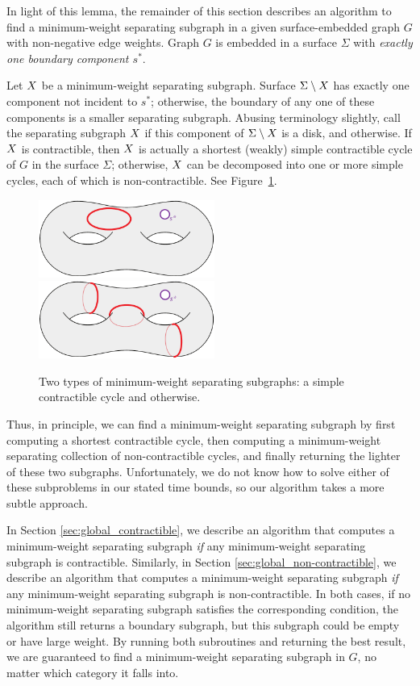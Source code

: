 \documentclass[letterpaper,review]{siamart190516}
\begin{document}
{In light of this lemma, the remainder of this section describes an algorithm to find a minimum-weight separating subgraph in a given surface-embedded graph $G$ with non-negative edge weights.
Graph $G$ is embedded in a surface $\Sigma$ with \emph{exactly one boundary component $s^*$}.

Let $X$ be a minimum-weight separating subgraph.
Surface $\Sigma \setminus X$ has exactly one component not incident to $s^*$; otherwise, the
boundary of any one of these components is a smaller separating subgraph.
Abusing terminology slightly,
call the separating subgraph $X$  if this component of $\Sigma \setminus
X$ is a disk, and  otherwise.  If $X$ is contractible, then
$X$ is actually a shortest (weakly) simple contractible cycle of $G$ in the surface $\Sigma$; otherwise, $X$ can be decomposed into one or more simple cycles, each of which is non-contractible.  See Figure~\ref{fig:global_cases}.


\begin{figure}[ht]
\centering
\includegraphics[height=1in]{Fig/shortcon2}\qquad
\includegraphics[height=1in]{Fig/homologous4}
\caption{Two types of minimum-weight separating subgraphs: a simple contractible cycle and otherwise.}
\label{fig:global_cases}
\end{figure}

Thus, in principle, we can find a minimum-weight separating subgraph by first computing a shortest contractible cycle, then computing a minimum-weight separating collection of non-contractible cycles, and finally returning the lighter of these two subgraphs.  Unfortunately, we do not know how to solve either of these subproblems in our stated time bounds, so our algorithm takes a more subtle approach. 

In Section \ref{sec:global_contractible}, we describe an algorithm that computes a minimum-weight separating subgraph \emph{if} any minimum-weight separating subgraph is contractible.  Similarly, in Section \ref{sec:global_non-contractible}, we describe an algorithm that computes a minimum-weight separating subgraph \emph{if} any minimum-weight separating subgraph is non-contractible.  In both cases, if no minimum-weight separating subgraph satisfies the corresponding condition, the algorithm still returns a boundary subgraph, but this subgraph could be empty or have large weight.  By running both subroutines and returning the best result, we are guaranteed to find a minimum-weight separating subgraph in $G$, no matter which category it falls into.


}
\end{document}
